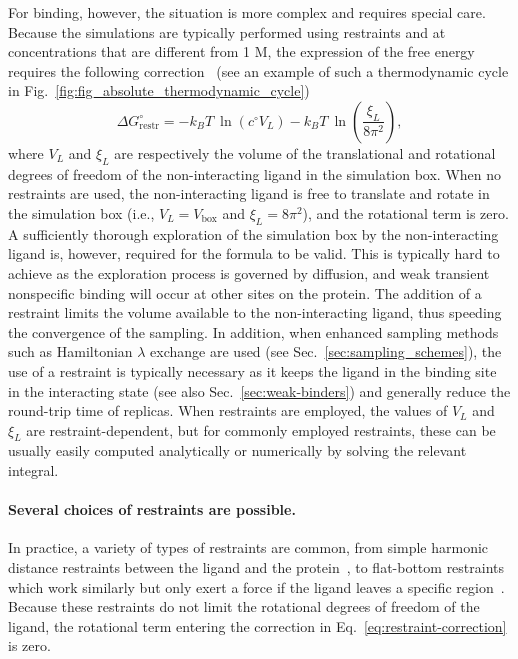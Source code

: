 \documentclass[9pt,bestpractices,pubversion]{livecoms}
\begin{document}
For binding, however, the situation is more complex and requires special care.
Because the simulations are typically performed using restraints and at concentrations that are different from 1 M, the expression of the free energy requires the following correction~\cite{gilson1997statisticalthermodynamic} (see an example of such a thermodynamic cycle in Fig.~\ref{fig:fig_absolute_thermodynamic_cycle})
\begin{equation}\label{eq:restraint-correction}
    \Delta G^{\circ}_{\mathrm{restr}} = -k_BT ~ \ln \left( c^{\circ}{V_L} \right) -k_BT ~ \ln \left( \frac{\xi_L}{8 \pi^2} \right),
\end{equation}
where $V_L$ and $\xi_L$ are respectively the volume of the translational and rotational degrees of freedom of the non-interacting ligand in the simulation box.
When no restraints are used, the non-interacting ligand is free to translate and rotate in the simulation box (i.e., $V_L = V_{\mathrm{box}}$ and $\xi_L = 8\pi^2$), and the rotational term is zero.
A sufficiently thorough exploration of the simulation box by the non-interacting ligand is, however, required for the formula to be valid.
This is typically hard to achieve as the exploration process is governed by diffusion, and weak transient nonspecific binding will occur at other sites on the protein. 
The addition of a restraint limits the volume available to the non-interacting ligand, thus speeding the convergence of the sampling.
In addition, when enhanced sampling methods such as Hamiltonian $\lambda$ exchange are used (see Sec.~\ref{sec:sampling_schemes}), the use of a restraint is typically necessary as it keeps the ligand in the binding site in the interacting state (see also Sec.~\ref{sec:weak-binders}) and generally reduce the round-trip time of replicas.
When restraints are employed, the values of $V_L$ and $\xi_L$ are restraint-dependent, but for commonly employed restraints, these can be usually easily computed analytically or numerically by solving the relevant integral.

\paragraph{Several choices of restraints are possible.}\label{ABFErest}
In practice, a variety of types of restraints are common, from simple harmonic distance restraints between the ligand and the protein~\cite{mobley2006use}, to flat-bottom restraints which work similarly but only exert a force if the ligand leaves a specific region~\cite{chen2007can}.
Because these restraints do not limit the rotational degrees of freedom of the ligand, the rotational term entering the correction in Eq.~\ref{eq:restraint-correction} is zero.
\end{document}
